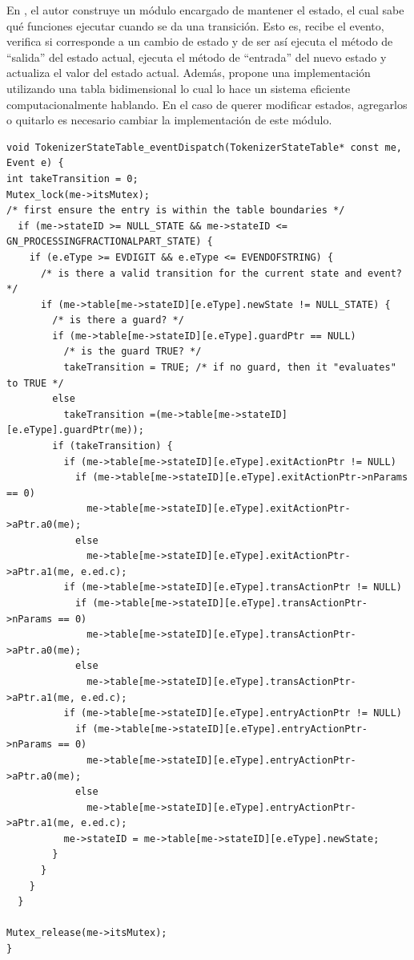 En \cite{douglass}, el autor construye un módulo encargado de mantener el estado, el cual sabe qué funciones ejecutar cuando se da una transición. Esto es, recibe el evento, verifica si corresponde a un cambio de estado y de ser así ejecuta el método de ``salida'' del estado actual, ejecuta el método de ``entrada'' del nuevo estado y actualiza el valor del estado actual. Además, propone una implementación utilizando una tabla bidimensional lo cual lo hace un sistema eficiente computacionalmente hablando. En el caso de querer modificar estados, agregarlos o quitarlo es necesario cambiar la implementación de este módulo. 

\begin{lstlisting}[caption=Código ejemplo Douglass State Table, label={ifsanidados}]
void TokenizerStateTable_eventDispatch(TokenizerStateTable* const me, Event e) {
int takeTransition = 0;
Mutex_lock(me->itsMutex);
/* first ensure the entry is within the table boundaries */
  if (me->stateID >= NULL_STATE && me->stateID <= GN_PROCESSINGFRACTIONALPART_STATE) {
    if (e.eType >= EVDIGIT && e.eType <= EVENDOFSTRING) {
      /* is there a valid transition for the current state and event? */
      if (me->table[me->stateID][e.eType].newState != NULL_STATE) {
        /* is there a guard? */
        if (me->table[me->stateID][e.eType].guardPtr == NULL)
          /* is the guard TRUE? */
          takeTransition = TRUE; /* if no guard, then it "evaluates" to TRUE */
        else
          takeTransition =(me->table[me->stateID][e.eType].guardPtr(me));
        if (takeTransition) {
          if (me->table[me->stateID][e.eType].exitActionPtr != NULL)
            if (me->table[me->stateID][e.eType].exitActionPtr->nParams == 0)
              me->table[me->stateID][e.eType].exitActionPtr->aPtr.a0(me);
            else
              me->table[me->stateID][e.eType].exitActionPtr->aPtr.a1(me, e.ed.c);
          if (me->table[me->stateID][e.eType].transActionPtr != NULL)
            if (me->table[me->stateID][e.eType].transActionPtr->nParams == 0)
              me->table[me->stateID][e.eType].transActionPtr->aPtr.a0(me);
            else
              me->table[me->stateID][e.eType].transActionPtr->aPtr.a1(me, e.ed.c);
          if (me->table[me->stateID][e.eType].entryActionPtr != NULL)
            if (me->table[me->stateID][e.eType].entryActionPtr->nParams == 0)
              me->table[me->stateID][e.eType].entryActionPtr->aPtr.a0(me);
            else
              me->table[me->stateID][e.eType].entryActionPtr->aPtr.a1(me, e.ed.c);
          me->stateID = me->table[me->stateID][e.eType].newState;
        }
      }
    }
  }

Mutex_release(me->itsMutex);
}
\end{lstlisting}


